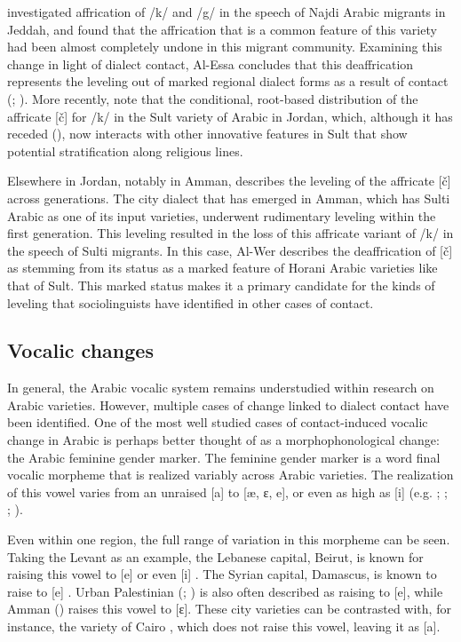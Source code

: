 \documentclass[output=paper]{langsci/langscibook}
\begin{document}
  \citet{Al-Essa2008} investigated affrication of /k/ and /g/ in the speech of Najdi Arabic migrants in Jeddah, and found that the affrication that is a common feature of this variety had been almost completely undone in this migrant community. Examining this change in light of dialect contact, Al-Essa concludes that this deaffrication represents the leveling out of marked regional dialect forms as a result of contact (\citealt{Trudgill1986}; \citealt{KerswillWilliams2000}). More recently, \citet{Al-WerEtAl2015} note that the conditional, root-based distribution of the affricate [č] for /k/ in the Sult variety of Arabic in Jordan, which, although it has receded (\citealt{Al-Wer1991}), now interacts with other innovative features in Sult that show potential stratification along religious lines. 

  Elsewhere in Jordan, notably in Amman, \citet{Al-Wer2007} describes the leveling of the affricate [č] across generations. The city dialect that has emerged in Amman, which has Sulti Arabic as one of its input varieties, underwent rudimentary leveling \citep{Trudgill2004} within the first generation. This leveling resulted in the loss of this affricate variant of /k/ in the speech of Sulti migrants. In this case, Al-Wer describes the deaffrication of [č] as stemming from its status as a marked feature of Horani Arabic varieties like that of Sult. This marked status makes it a primary candidate for the kinds of leveling that sociolinguists have identified in other cases of contact. 


 
 \subsection{Vocalic changes}


In general, the Arabic vocalic system remains understudied within research on Arabic varieties. However, multiple cases of change linked to dialect contact have been identified. One of the most well studied cases of contact-induced vocalic change in Arabic is perhaps better thought of as a morphophonological change: the Arabic feminine gender marker. The feminine gender marker is a word final vocalic morpheme that is realized variably across Arabic varieties. The realization of this vowel varies from an unraised [a] to [æ, ɛ, e], or even as high as [i] (e.g. \citealt{Al-Wer2007}; \citealt{Naïm2011}; \citealt{Shahin2011}; \citealt{Woidich2011}). 

Even within one region, the full range of variation in this morpheme can be seen. Taking the Levant as an example, the Lebanese capital, Beirut, is known for raising this vowel to [e] or even [i] \citep{Naïm2011}. The Syrian capital, Damascus, is known to raise to [e] \citep{Lentin2011Damascus}. Urban Palestinian (\citealt{Rosenhouse2011}; \citealt{Shahin2011}) is also often described as raising to [e], while Amman (\citealt{Al-Wer2007}) raises this vowel to [ɛ]. These city varieties can be contrasted with, for instance, the variety of Cairo \citep{Woidich2011}, which does not raise this vowel, leaving it as [a]. 
\end{document}
